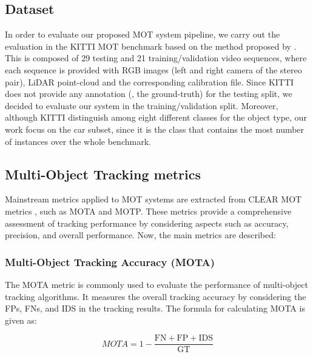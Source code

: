 
\subsection{Dataset}
\label{subsec:4_mot_dataset}

In order to evaluate our proposed \ac{MOT} system pipeline, we carry out the evaluation in the KITTI \ac{MOT} benchmark \cite{geiger2012we} based on the method proposed by \cite{weng20203d}. This is composed of 29 testing and 21 training/validation video sequences, where each sequence is provided with RGB images (left and right camera of the stereo pair), \ac{LiDAR} point-cloud and the corresponding calibration file. Since KITTI does not provide any annotation (\ie, the ground-truth) for the testing split, we decided to evaluate our system in the training/validation split. Moreover, although KITTI distinguish among eight different classes for the object type, our work focus on the car subset, since it is the class that contains the most number of instances over the whole benchmark.

\subsection{Multi-Object Tracking metrics}
\label{subsec:4_mot_metrics}

Mainstream metrics applied to MOT systems are extracted from CLEAR \ac{MOT} metrics \cite{bernardin2008evaluating}, such as \acf{MOTA} and \acf{MOTP}. These metrics provide a comprehensive assessment of tracking performance by considering aspects such as accuracy, precision, and overall performance. Now, the main metrics are described:

\subsubsection{Multi-Object Tracking Accuracy (MOTA)}
\label{subsubsec:4_MOTA}

The \acf{MOTA} metric is commonly used to evaluate the performance of multi-object tracking algorithms. It measures the overall tracking accuracy by considering the \acp{FP}, \acp{FN}, and \ac{IDS} in the tracking results. The formula for calculating \ac{MOTA} is given as:

\begin{equation}
	MOTA = 1 - \frac{{\text{{FN}} + \text{{FP}} + \text{{IDS}}}}{{\text{{GT}}}}
\end{equation}

